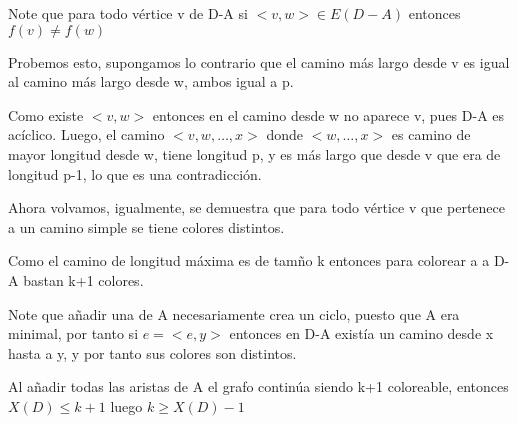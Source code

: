 \documentclass[a4paper,1pt]{report}
\begin{document}
Note que para todo vértice v de D-A si $<v,w>\in E(D-A)$ entonces $f(v)\neq f(w)$

Probemos esto, supongamos lo contrario que el camino más largo desde v es igual al camino más largo desde w, ambos igual a p.

Como existe $<v,w>$ entonces en el camino desde w no aparece v, pues D-A es acíclico.
Luego, el camino $<v,w,\dots,x>$ donde $<w,\dots,x>$ es camino de mayor longitud desde w, tiene longitud p, y es más largo que desde v que era de longitud p-1, lo que es una contradicción.

Ahora volvamos, igualmente, se demuestra que para todo vértice v que pertenece a un camino simple se tiene colores distintos.

Como el camino de longitud máxima es de tamño k entonces para colorear a a D-A bastan k+1 colores.

Note que añadir una de A necesariamente crea un ciclo, puesto que A era minimal, por tanto si $e=<e,y>$ entonces en D-A existía un camino desde x hasta a y, y por tanto sus colores son distintos.

Al añadir todas las aristas de A el grafo continúa siendo k+1 coloreable, entonces $X(D)\leq k+1$  luego $k\geq X(D)-1$
  
\end{document}
